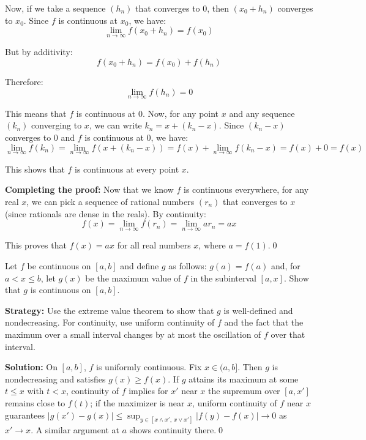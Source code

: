 Now, if we take a sequence $(h_n)$ that converges to $0$, then $(x_0 + h_n)$ converges to $x_0$. Since $f$ is continuous at $x_0$, we have:
\[\lim_{n \to \infty} f(x_0 + h_n) = f(x_0)\]

But by additivity:
\[f(x_0 + h_n) = f(x_0) + f(h_n)\]

Therefore:
\[\lim_{n \to \infty} f(h_n) = 0\]

This means that $f$ is continuous at $0$. Now, for any point $x$ and any sequence $(k_n)$ converging to $x$, we can write $k_n = x + (k_n - x)$. Since $(k_n - x)$ converges to $0$ and $f$ is continuous at $0$, we have:
\[\lim_{n \to \infty} f(k_n) = \lim_{n \to \infty} f(x + (k_n - x)) = f(x) + \lim_{n \to \infty} f(k_n - x) = f(x) + 0 = f(x)\]

This shows that $f$ is continuous at every point $x$.

\medskip\noindent\textbf{Completing the proof:} Now that we know $f$ is continuous everywhere, for any real $x$, we can pick a sequence of rational numbers $(r_n)$ that converges to $x$ (since rationals are dense in the reals). By continuity:
\[f(x) = \lim_{n \to \infty} f(r_n) = \lim_{n \to \infty} ar_n = ax\]

This proves that $f(x) = ax$ for all real numbers $x$, where $a = f(1)$.\qed



\begin{problembox}
\begin{problemstatement}
Let \( f \) be continuous on \([a, b]\) and define \( g \) as follows: \( g(a) = f(a) \) and, for \( a < x \leq b \), let \( g(x) \) be the maximum value of \( f \) in the subinterval \([a, x]\). Show that \( g \) is continuous on \([a, b]\).
\end{problemstatement}
\end{problembox}

\noindent\textbf{Strategy:} Use the extreme value theorem to show that $g$ is well-defined and nondecreasing. For continuity, use uniform continuity of $f$ and the fact that the maximum over a small interval changes by at most the oscillation of $f$ over that interval.

\bigskip\noindent\textbf{Solution:}
On $[a,b]$, $f$ is uniformly continuous. Fix $x\in(a,b]$. Then $g$ is nondecreasing and satisfies $g(x)\ge f(x)$. If $g$ attains its maximum at some $t\le x$ with $t<x$, continuity of $f$ implies for $x'$ near $x$ the supremum over $[a,x']$ remains close to $f(t)$; if the maximizer is near $x$, uniform continuity of $f$ near $x$ guarantees $|g(x')-g(x)|\le \sup_{y\in[x\wedge x',\,x\vee x']}|f(y)-f(x)|\to 0$ as $x'\to x$. A similar argument at $a$ shows continuity there.\qed



